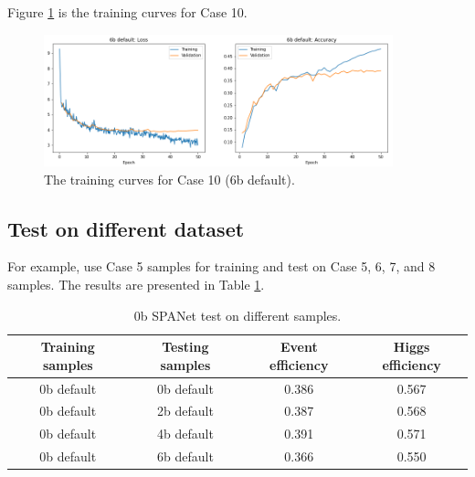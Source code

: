 \documentclass[12pt]{article}
\begin{document}
		Figure \ref{fig:loss_and_accuracy_curve_6b_default} is the training curves for Case 10. 
		\begin{figure}[htpb]
			\centering
			\includegraphics[width=0.9\textwidth]{loss_and_accuracy_curve_6b_default.png}
			\caption{The training curves for Case 10 (6b default).}
			\label{fig:loss_and_accuracy_curve_6b_default}
		\end{figure}
	\subsection{Test on different dataset}%
	\label{sub:test_on_different_dataset}
		For example, use Case 5 samples for training and test on Case 5, 6, 7, and 8 samples. The results are presented in Table \ref{tab:SPANet_1M_0b_default_test_on_different_triHiggs_data}.
		\begin{table}[htpb]
			\centering
			\caption{0b SPANet test on different samples.}
			\label{tab:SPANet_1M_0b_default_test_on_different_triHiggs_data}
			\begin{tabular}{cc|cc}
				Training samples & Testing samples & Event efficiency & Higgs efficiency \\
				\hline 
				0b default      & 0b default     & 0.386        & 0.567    \\
				0b default      & 2b default     & 0.387        & 0.568    \\
				0b default      & 4b default     & 0.391        & 0.571    \\
				0b default      & 6b default     & 0.366        & 0.550    \\
			\end{tabular}
		\end{table}	
\end{document}
